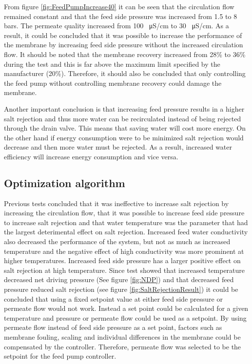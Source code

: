 From figure \ref{fig:FeedPumpIncrease40} it can be seen that the circulation flow remained constant and that the feed side pressure was increased from 1.5 to 8 bars. The permeate quality increased from 100 \SI{}{\micro\siemens}/cm to 30 \SI{}{\micro\siemens}/cm. As a result, it could be concluded that it was possible to increase the performance of the membrane by increasing feed side pressure without the increased circulation flow. It should be noted that the membrane recovery increased from 28\% to 36\% during the test and this is far above the maximum limit specified by the manufacturer (20\%). Therefore, it should also be concluded that only controlling the feed pump without controlling membrane recovery could damage the membrane. 

Another important conclusion is that increasing feed pressure results in a higher salt rejection and thus more water can be recirculated instead of being rejected through the drain valve. This means that saving water will cost more energy. On the other hand if energy consumption were to be minimized salt rejection would decrease and then more water must be rejected. As a result, increased water efficiency will increase energy consumption and vice versa.  

 
\newpage
\subsection{Optimization algorithm}

Previous tests concluded that it was ineffective to increase salt rejection by increasing the circulation flow, that it was possible to increase feed side pressure to increase salt rejection and that water temperature was the parameter that had the largest deterimental effect on salt rejection. Increased feed water conductivity also decreased the performance of the system, but not as much as increased temperature and the negative effect of high conductivity was more prominent at higher temperatures. Increased feed side pressure has a larger positive effect on salt rejection at high temperature.
Since test showed that increased temperature decreased net driving pressure (See figure \ref{fig:NDP}) and that decreased feed pressure reduced salt rejection (see figure \ref{fig:SaltRejectionResult}) it could be concluded that using a fixed setpoint value at either feed side pressure or permeate flow would not work. Instead a set point could be calculated for a given temperature and pressure or permeate flow could be used as a setpoint.
By using permeate flow instead of feed side pressure as a set point, factors such as membrane fouling, scaling and individual differences in the membrane could be compensated by the controller. Therefore, permeate flow was selected to be the setpoint for the feed pump controller. 

